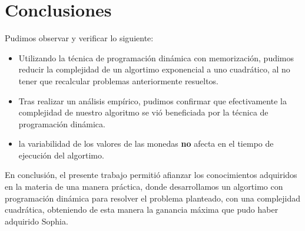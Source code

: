 \section{Conclusiones}

Pudimos observar y verificar lo siguiente:

\begin{itemize}

\item Utilizando la técnica de programación dinámica con memorización, pudimos reducir la complejidad de un algortimo exponencial a uno cuadrático, al no tener que recalcular problemas anteriormente resueltos.
\item Tras realizar un análisis empírico, pudimos confirmar que efectivamente la complejidad de nuestro algoritmo se vió beneficiada por la técnica de programación dinámica.
\item la variabilidad de los valores de las monedas \textbf{no} afecta en el tiempo de ejecución del algortimo.
\end {itemize}

En conclusión, el presente trabajo permitió afianzar los conocimientos adquiridos en la materia de una manera práctica, donde desarrollamos un algortimo con programación dinámica para resolver el problema planteado, con una complejidad cuadrática, obteniendo de esta manera la ganancia máxima que pudo haber adquirido Sophia.